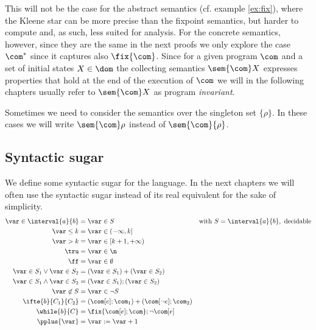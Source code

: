 This will not be the case for the abstract semantics (cf. example
\ref{ex:fix}), where the Kleene star can be more precise than the
fixpoint semantics, but harder to compute and, as such, less suited
for analysis. For the concrete semantics, however, since they are the
same in the next proofs we only explore the case \(\com^*\) since it
captures also \(\fix{\com}\). Since for a given program \(\com\) and a
set of initial states \(X \in \dom\) the collecting semantics
\(\sem{\com}X\) expresses properties that hold at the end of the
execution of \(\com\) we will in the following chapters usually refer
to \(\sem{\com}X\) as program \emph{invariant}.

\begin{notation}
  Sometimes we need to consider the semantics over the singleton set
  \(\{\rho\}\). In these cases we will write \(\sem{\com}\rho\)
  instead of \(\sem{\com}\{\rho\}\).
\end{notation}


\subsection{Syntactic sugar}\label{sub:sugar}
We define some syntactic sugar for the language. In the next chapters
we will often use the syntactic sugar instead of its real equivalent
for the sake of simplicity.
\begin{align*}
  \var \in \interval{a}{b} & = \var \in S & \text{with } S = \interval{a}{b}, \text{ decidable}\\
  \var \leq k & = \var \in (-\infty, k]\\
  \var > k & = \var \in [k+1, + \infty) \\
  \tru & = \var \in \n \\
  \ff & = \var \in \emptyset \\
  \var \in S_1 \vee \var \in S_2 & = (\var \in S_1) + (\var \in S_2) \\ 
  \var \in S_1 \wedge \var \in S_2 & = (\var \in S_1);(\var \in S_2) \\
  \var \not\in S & = \var \in \neg S \\
  \ifte{b}{C_1}{C_2} & = (\com[e];\com_1) + (\com[\neg e];\com_2) \\
  \while{b}{C} & = \fix{\com[e];\com};\neg\com[e] \\
  \pplus{\var} & = \var := \var + 1
\end{align*}

